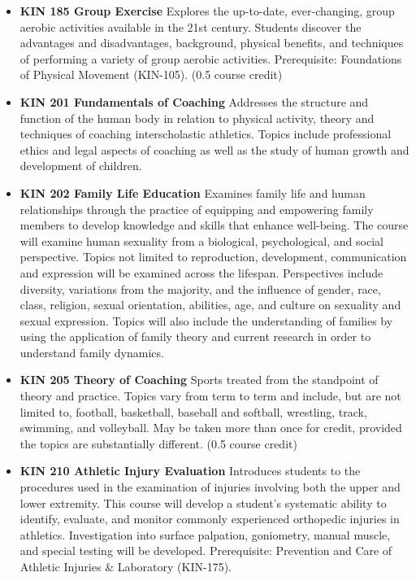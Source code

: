 \documentclass[
  letterpaper,
]{scrbook}
\begin{document}
\begin{itemize}
\item
  \textbf{KIN 185 Group Exercise} Explores the up-to-date,
  ever-changing, group aerobic activities available in the 21st century.
  Students discover the advantages and disadvantages, background,
  physical benefits, and techniques of performing a variety of group
  aerobic activities. Prerequisite: Foundations of Physical Movement
  (KIN-105). (0.5 course credit)
\item
  \textbf{KIN 201 Fundamentals of Coaching} Addresses the structure and
  function of the human body in relation to physical activity, theory
  and techniques of coaching interscholastic athletics. Topics include
  professional ethics and legal aspects of coaching as well as the study
  of human growth and development of children.
\item
  \textbf{KIN 202 Family Life Education} Examines family life and human
  relationships through the practice of equipping and empowering family
  members to develop knowledge and skills that enhance well-being. The
  course will examine human sexuality from a biological, psychological,
  and social perspective. Topics not limited to reproduction,
  development, communication and expression will be examined across the
  lifespan. Perspectives include diversity, variations from the
  majority, and the influence of gender, race, class, religion, sexual
  orientation, abilities, age, and culture on sexuality and sexual
  expression. Topics will also include the understanding of families by
  using the application of family theory and current research in order
  to understand family dynamics.
\item
  \textbf{KIN 205 Theory of Coaching} Sports treated from the standpoint
  of theory and practice. Topics vary from term to term and include, but
  are not limited to, football, basketball, baseball and softball,
  wrestling, track, swimming, and volleyball. May be taken more than
  once for credit, provided the topics are substantially different. (0.5
  course credit)
\item
  \textbf{KIN 210 Athletic Injury Evaluation} Introduces students to the
  procedures used in the examination of injuries involving both the
  upper and lower extremity. This course will develop a student's
  systematic ability to identify, evaluate, and monitor commonly
  experienced orthopedic injuries in athletics. Investigation into
  surface palpation, goniometry, manual muscle, and special testing will
  be developed. Prerequisite: Prevention and Care of Athletic Injuries
  \& Laboratory (KIN-175).

\end{itemize}
\end{document}
